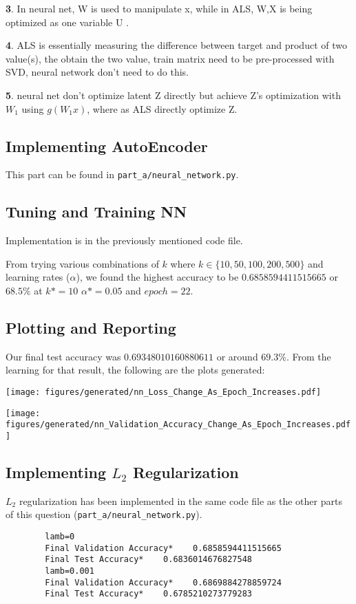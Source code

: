 \documentclass{article}
\begin{document}
    \textbf{3}. In neural net, W is used to manipulate x, while in ALS, W,X is being optimized as one variable U .

    \textbf{4}. ALS is essentially measuring the difference between target and product of two value(s), the obtain the two value, train matrix need to be pre-processed with SVD, neural network don't need to do this.

    \textbf{5}. neural net don't optimize latent Z directly but achieve Z's optimization with $W_1$ using $g(W_1 x)$, where as ALS directly optimize Z.


    \subsection{Implementing AutoEncoder}
    This part can be found in \verb|part_a/neural_network.py|.

    \subsection{Tuning and Training NN}
    Implementation is in the previously mentioned code file.

    From trying various combinations of $k$ where $k\in \{10, 50, 100, 200, 500\}$ and learning rates ($\alpha$), we found the highest accuracy to be $0.6858594411515665$ or $68.5\%$ at $k*=10$ $\alpha*=0.05$ and $epoch=22$.


    \subsection{Plotting and Reporting}
    Our final test accuracy was $0.69348010160880611$ or around $69.3\%$. From the learning for that result, the following are the plots generated:

    \texttt{[image: figures/generated/nn\_Loss\_Change\_As\_Epoch\_Increases.pdf]}

    \texttt{[image: figures/generated/nn\_Validation\_Accuracy\_Change\_As\_Epoch\_Increases.pdf]}

    \subsection{Implementing $L_2$ Regularization}
    $L_2$ regularization has been implemented in the same code file as the other parts of this question (\verb|part_a/neural_network.py|).

    \begin{verbatim}
        lamb=0
        Final Validation Accuracy*    0.6858594411515665
        Final Test Accuracy*    0.6836014676827548
        lamb=0.001
        Final Validation Accuracy*    0.6869884278859724
        Final Test Accuracy*    0.6785210273779283
    \end{verbatim}
\end{document}
